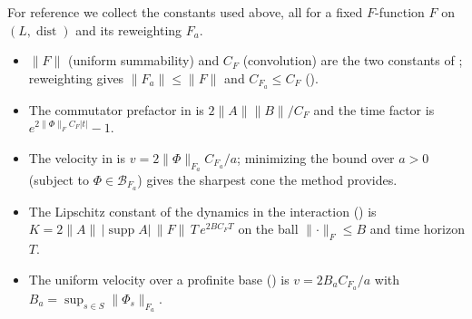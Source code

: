 \documentclass[12pt]{article}
\newcommand{\Ffun}{F}                          %
\newcommand{\norm}[1]{\lVert #1\rVert}
\newcommand{\Fnorm}[1]{\lVert #1\rVert_{F}}
\newcommand{\Fanorm}[1]{\lVert #1\rVert_{F_a}}
\newcommand{\supp}{\operatorname{supp}}
\newcommand{\dist}{\operatorname{dist}}
\theoremstyle{definition}
\theoremstyle{remark}
\begin{document}
For reference we collect the constants used above, all for a fixed $\Ffun$-function $\Ffun$ on
$(L,\dist)$ and its reweighting $\Ffun_a$.
\begin{itemize}
\item $\norm{\Ffun}$ (uniform summability) and $C_\Ffun$ (convolution) are the two constants
  of ; reweighting gives $\norm{\Ffun_a}\le\norm{\Ffun}$ and $C_{\Ffun_a}\le
  C_\Ffun$ ().
\item The commutator prefactor in  is $2\norm{A}\norm{B}/C_\Ffun$ and the
  time factor is $e^{2\Fnorm{\Phi}C_\Ffun\lvert t\rvert}-1$.
\item The velocity in  is $v=2\Fanorm{\Phi}C_{\Ffun_a}/a$; minimizing the
  bound over $a>0$ (subject to $\Phi\in\mathcal B_{\Ffun_a}$) gives the sharpest cone the
  method provides.
\item The Lipschitz constant of the dynamics in the interaction
  () is $K=2\norm{A}\,\lvert\supp A\rvert\,\norm{\Ffun}\,T\,
  e^{2BC_\Ffun T}$ on the ball $\Fnorm{\cdot}\le B$ and time horizon $T$.
\item The uniform velocity over a profinite base () is
  $v=2B_aC_{\Ffun_a}/a$ with $B_a=\sup_{s\in S}\Fanorm{\Phi_s}$.
\end{itemize}



\end{document}
